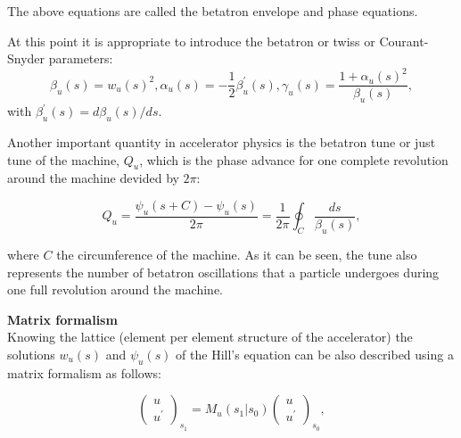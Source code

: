 The above equations are called the betatron envelope and phase equations.

At this point it is appropriate to introduce the betatron or twiss or Courant-Snyder parameters:%
\begin{subequations}\label{eq:twiss_func}
    \begin{equation}
        \beta_u(s) = w_u(s)^2,
    \end{equation}    
    \begin{equation}
       \alpha_u(s) = -\frac{1}{2} \beta^{\prime}_u(s),
    \end{equation} 
    \begin{equation}
       \gamma_u(s) = \frac{1+\alpha_u(s)^2}{\beta_u(s)},
    \end{equation}
\end{subequations}
with $\beta^{\prime}_u(s) = d\beta_u(s)/ds$.

Another important quantity in accelerator physics is the betatron tune or just tune of the machine, $Q_u$, which is the phase advance for one complete revolution around the machine devided by $2\pi$:

\begin{equation}\label{eq:betatron_tune}
    Q_u = \frac{\psi_u(s+C)-\psi_u(s)}{2\pi} = \frac{1}{2\pi} \oint_C \frac{ds}{\beta_u(s)},
\end{equation}

where $C$ the circumference of the machine. As it can be seen, the tune also represents the number of betatron oscillations that a particle undergoes during one full revolution around the machine.


\textbf{Matrix formalism}\\
Knowing the lattice (element per element structure of the accelerator) the solutions $w_u(s)$ and $\psi_u(s)$ of the Hill's equation can be also described using a matrix formalism as follows:

\begin{equation}\label{eq:matrix_formalism_intro}
   \begin{pmatrix}
    u\\ 
    u^\prime
    \end{pmatrix}_{s_1} = M_u (s_1 |  s_0) \begin{pmatrix}
    u\\ 
    u^\prime
    \end{pmatrix}_{s_0},
\end{equation}

